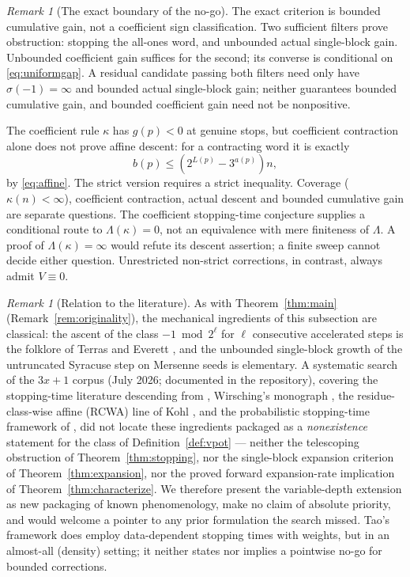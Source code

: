 \documentclass[11pt]{amsart}
\theoremstyle{definition}
\theoremstyle{remark}
\newtheorem{remark}[theorem]{Remark}
\begin{document}
\begin{remark}[The exact boundary of the no-go]\label{rem:boundary}
The exact criterion is bounded cumulative gain, not a coefficient sign classification. Two sufficient filters prove obstruction: stopping the all-ones word, and unbounded actual single-block gain. Unbounded coefficient gain suffices for the second; its converse is conditional on \eqref{eq:uniformgap}. A residual candidate passing both filters need only have $\sigma(-1)=\infty$ and bounded actual single-block gain; neither guarantees bounded cumulative gain, and bounded coefficient gain need not be nonpositive.

The coefficient rule $\kappa$ has $g(p)<0$ at genuine stops, but coefficient contraction alone does not prove affine descent: for a contracting word it is exactly
\[
b(p)\le(2^{L(p)}-3^{a(p)})n,
\]
by \eqref{eq:affine}. The strict version requires a strict inequality. Coverage ($\kappa(n)<\infty$), coefficient contraction, actual descent and bounded cumulative gain are separate questions. The coefficient stopping-time conjecture supplies a conditional route to $\Lambda(\kappa)=0$, not an equivalence with mere finiteness of $\Lambda$. A proof of $\Lambda(\kappa)=\infty$ would refute its descent assertion; a finite sweep cannot decide either question. Unrestricted non-strict corrections, in contrast, always admit $V\equiv0$.
\end{remark}

\begin{remark}[Relation to the literature]\label{rem:stoppingoriginality}
As with Theorem~\ref{thm:main} (Remark~\ref{rem:originality}), the mechanical ingredients of this subsection are classical: the ascent of the class $-1 \bmod 2^\ell$ for $\ell$ consecutive accelerated steps is the folklore of Terras \cite{terras1976} and Everett \cite{everett1977}, and the unbounded single-block growth of the untruncated Syracuse step on Mersenne seeds is elementary. A systematic search of the $3x+1$ corpus (July 2026; documented in the repository), covering the stopping-time literature descending from \cite{terras1976,garner1981}, Wirsching's monograph \cite{wirsching1998}, the residue-class-wise affine (RCWA) line of Kohl \cite{kohl2008}, and the probabilistic stopping-time framework of \cite{tao2022}, did not locate these ingredients packaged as a \emph{nonexistence} statement for the class of Definition~\ref{def:vpot} --- neither the telescoping obstruction of Theorem~\ref{thm:stopping}, nor the single-block expansion criterion of Theorem~\ref{thm:expansion}, nor the proved forward expansion-rate implication of Theorem~\ref{thm:characterize}. We therefore present the variable-depth extension as new packaging of known phenomenology, make no claim of absolute priority, and would welcome a pointer to any prior formulation the search missed. Tao's framework \cite{tao2022} does employ data-dependent stopping times with weights, but in an almost-all (density) setting; it neither states nor implies a pointwise no-go for bounded corrections.
\end{remark}
\end{document}
